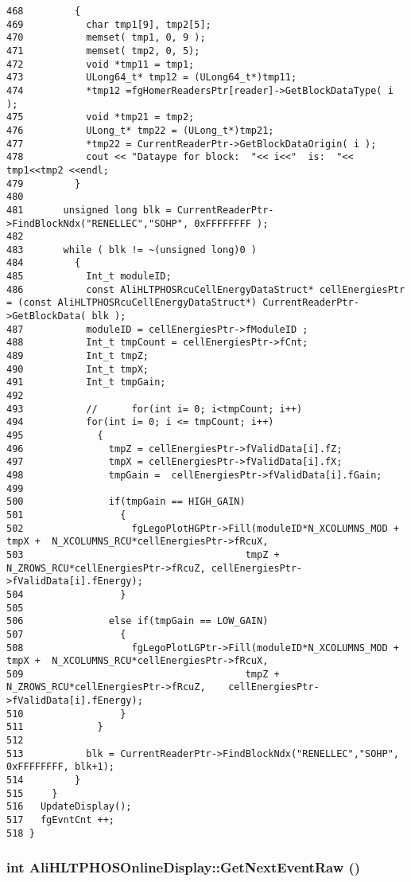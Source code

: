 \begin{verbatim}
468         {
469           char tmp1[9], tmp2[5];
470           memset( tmp1, 0, 9 );
471           memset( tmp2, 0, 5);
472           void *tmp11 = tmp1;
473           ULong64_t* tmp12 = (ULong64_t*)tmp11;
474           *tmp12 =fgHomerReadersPtr[reader]->GetBlockDataType( i );
475           void *tmp21 = tmp2;
476           ULong_t* tmp22 = (ULong_t*)tmp21;
477           *tmp22 = CurrentReaderPtr->GetBlockDataOrigin( i );
478           cout << "Dataype for block:  "<< i<<"  is:  "<< tmp1<<tmp2 <<endl;
479         }
480 
481       unsigned long blk = CurrentReaderPtr->FindBlockNdx("RENELLEC","SOHP", 0xFFFFFFFF );
482 
483       while ( blk != ~(unsigned long)0 ) 
484         {
485           Int_t moduleID;
486           const AliHLTPHOSRcuCellEnergyDataStruct* cellEnergiesPtr = (const AliHLTPHOSRcuCellEnergyDataStruct*) CurrentReaderPtr->GetBlockData( blk );  
487           moduleID = cellEnergiesPtr->fModuleID ;
488           Int_t tmpCount = cellEnergiesPtr->fCnt;
489           Int_t tmpZ;
490           Int_t tmpX;
491           Int_t tmpGain;
492           
493           //      for(int i= 0; i<tmpCount; i++)
494           for(int i= 0; i <= tmpCount; i++)
495             {
496               tmpZ = cellEnergiesPtr->fValidData[i].fZ;
497               tmpX = cellEnergiesPtr->fValidData[i].fX;
498               tmpGain =  cellEnergiesPtr->fValidData[i].fGain;
499               
500               if(tmpGain == HIGH_GAIN)
501                 {
502                   fgLegoPlotHGPtr->Fill(moduleID*N_XCOLUMNS_MOD + tmpX +  N_XCOLUMNS_RCU*cellEnergiesPtr->fRcuX,  
503                                       tmpZ + N_ZROWS_RCU*cellEnergiesPtr->fRcuZ, cellEnergiesPtr->fValidData[i].fEnergy);
504                 }
505                   
506               else if(tmpGain == LOW_GAIN)
507                 {
508                   fgLegoPlotLGPtr->Fill(moduleID*N_XCOLUMNS_MOD + tmpX +  N_XCOLUMNS_RCU*cellEnergiesPtr->fRcuX,
509                                       tmpZ + N_ZROWS_RCU*cellEnergiesPtr->fRcuZ,    cellEnergiesPtr->fValidData[i].fEnergy);
510                 }
511             }
512                 
513           blk = CurrentReaderPtr->FindBlockNdx("RENELLEC","SOHP", 0xFFFFFFFF, blk+1);
514         }
515     }
516   UpdateDisplay();
517   fgEvntCnt ++;
518 }
\end{verbatim}\normalsize 


\subsubsection{\setlength{\rightskip}{0pt plus 5cm}int Ali\-HLTPHOSOnline\-Display::Get\-Next\-Event\-Raw ()}\label{classAliHLTPHOSOnlineDisplay_a2}




